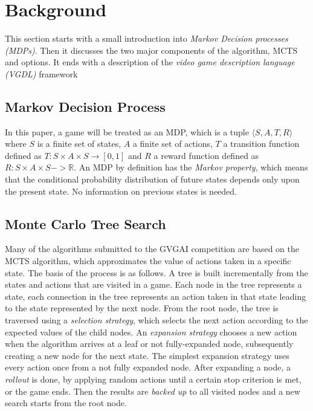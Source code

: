 \section{Background}
\label{sec:background}

This section starts with a small introduction into \emph{Markov
Decision processes (MDPs)}. Then it discusses the two major components of the
algorithm, MCTS and options. It ends with a description of the \emph{video game
description language (VGDL)} framework

\subsection{Markov Decision Process}
In this paper, a game will be treated as an MDP, which is a
tuple $\langle S, A, T, R \rangle$ where $S$ is a finite set of states, $A$ a
finite set of actions, $T$ a transition function defined as $T : S \times A
\times S \rightarrow \left[0,1\right]$ and $R$ a reward function defined as $R:
S \times A \times S -> \mathbb{R}$. An MDP by definition has the \emph{Markov
property}, which means that the conditional probability distribution of future
states depends only upon the present state. No information on previous states
is needed.

\subsection{Monte Carlo Tree Search}
Many of the algorithms submitted to the GVGAI competition are based on the MCTS
algorithm\cn, which approximates the value of actions taken in a specific state.
The basis of the process is as follows. A tree is built incrementally from the
states and actions that are visited in a game.  Each node in the tree represents
a state, each connection in the tree represents an action taken in that state
leading to the state represented by the next node.  From the root node, the tree
is traversed using a \emph{selection strategy}, which selects the next action according
to the expected values of the child nodes. An \emph{expansion strategy} chooses
a new action when the algorithm arrives at a leaf or not fully-expanded node,
subsequently creating a new node for the next state. The simplest expansion
strategy uses every action once from a not fully expanded node. After expanding
a node, a \emph{rollout} is done, by applying random actions until a certain
stop criterion is met, or the game ends. Then the results are \emph{backed up}
to all visited nodes and a new search starts from the root node.

